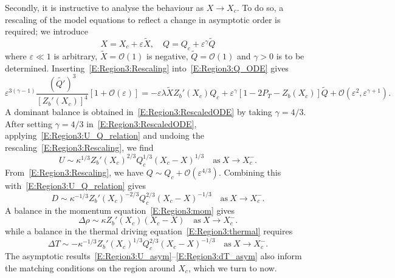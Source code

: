 \documentclass[openacc]{rsproca_new}%
\newcommand{\order}[1]{\mathcal{O}(#1)}
\newcommand{\Pt}{\textit{P}_T}
\begin{document}
Secondly, it is instructive to analyse the behaviour as $X \to X_c$. To do so, a rescaling of the model equations to reflect a change in asymptotic order is required; we introduce
\begin{equation}\label{E:Region3:Rescaling}
X = X_c + \varepsilon \tilde{X}, \quad Q = Q_c + \varepsilon^\gamma \tilde{Q}
\end{equation}
where $\varepsilon \ll 1$ is arbitrary, $\tilde{X} =\order{1}$ is negative, $\tilde{Q} = \order{1}$ and $\gamma >0$ is to be determined. Inserting~\eqref{E:Region3:Rescaling} into~\eqref{E:Region3:Q_ODE} gives
\begin{equation}\label{E:Region3:RescaledODE}
\varepsilon^{3(\gamma - 1)}\frac{\left(\tilde{Q'}\right)^3}{\left[Z_b'(X_c)\right]^4}\left[1 + \order{\varepsilon} \right]= -\varepsilon\lambda\tilde{X}Z_b'(X_c)Q_c + \varepsilon^\gamma \left[1 - 2\Pt - Z_b(X_c)\right] \tilde{Q} + \order{\varepsilon^2, \varepsilon^{\gamma + 1}}.
\end{equation}
A dominant balance is obtained in~\eqref{E:Region3:RescaledODE} by taking $\gamma = 4/3$. After setting $\gamma = 4/3$ in~\eqref{E:Region3:RescaledODE}, applying~\eqref{E:Region3:U_Q_relation} and undoing the rescaling~\eqref{E:Region3:Rescaling}, we find 
\begin{equation}\label{E:Region3:U_asym}
U \sim \kappa^{1/3} Z_b'(X_c)^{2/3} Q_c^{1/3}(X_c - X)^{1/3} \quad \text{as}~X \to X_c^-.
\end{equation}
From~\eqref{E:Region3:Rescaling}, we have $Q \sim Q_c + \order{\varepsilon^{4/3}}$. Combining this with~\eqref{E:Region3:U_Q_relation} gives
\begin{equation}\label{E:Region3:D_asym}
D \sim \kappa^{-1/3} Z_b'(X_c)^{-2/3} Q_c^{2/3}(X_c - X)^{-1/3} \quad \text{as}~X \to X_c^-.
\end{equation}
A balance in the momentum equation~\eqref{E:Region3:mom} gives
\begin{equation}\label{E:Region3:drho_asym}
\Delta \rho \sim  \kappa Z_b'(X_c) (X_c - X)\quad \text{as}~X \to X_c^-.
\end{equation}
while a balance in the thermal driving equation~\eqref{E:Region3:thermal} requires
\begin{equation}\label{E:Region3:dT_asym}
 \Delta T \sim -\kappa^{-1/3} Z_b'(X_c)^{1/3} Q_c^{2/3}(X_c - X)^{-1/3} \quad \text{as}~X \to X_c^-.
 \end{equation}
The asymptotic results~\eqref{E:Region3:U_asym}--\eqref{E:Region3:dT_asym} also inform the matching conditions on the region around $X_c$, which we turn to now.
\end{document}
